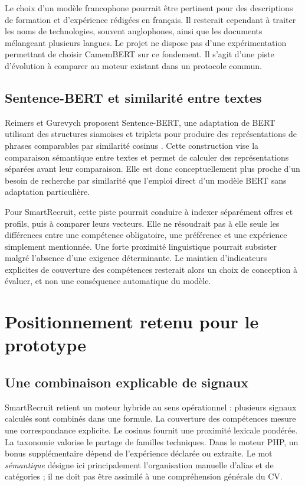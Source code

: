 Le choix d'un modèle francophone pourrait être pertinent pour des descriptions de formation et d'expérience rédigées en français. Il resterait cependant à traiter les noms de technologies, souvent anglophones, ainsi que les documents mélangeant plusieurs langues. Le projet ne dispose pas d'une expérimentation permettant de choisir CamemBERT sur ce fondement. Il s'agit d'une piste d'évolution à comparer au moteur existant dans un protocole commun.

\subsection{Sentence-BERT et similarité entre textes}

Reimers et Gurevych proposent Sentence-BERT, une adaptation de BERT utilisant des structures siamoises et triplets pour produire des représentations de phrases comparables par similarité cosinus \cite{reimers2019}. Cette construction vise la comparaison sémantique entre textes et permet de calculer des représentations séparées avant leur comparaison. Elle est donc conceptuellement plus proche d'un besoin de recherche par similarité que l'emploi direct d'un modèle BERT sans adaptation particulière.

Pour SmartRecruit, cette piste pourrait conduire à indexer séparément offres et profils, puis à comparer leurs vecteurs. Elle ne résoudrait pas à elle seule les différences entre une compétence obligatoire, une préférence et une expérience simplement mentionnée. Une forte proximité linguistique pourrait subsister malgré l'absence d'une exigence déterminante. Le maintien d'indicateurs explicites de couverture des compétences resterait alors un choix de conception à évaluer, et non une conséquence automatique du modèle.

\section{Positionnement retenu pour le prototype}

\subsection{Une combinaison explicable de signaux}

SmartRecruit retient un moteur hybride au sens opérationnel : plusieurs signaux calculés sont combinés dans une formule. La couverture des compétences mesure une correspondance explicite. Le cosinus fournit une proximité lexicale pondérée. La taxonomie valorise le partage de familles techniques. Dans le moteur PHP, un bonus supplémentaire dépend de l'expérience déclarée ou extraite. Le mot \emph{sémantique} désigne ici principalement l'organisation manuelle d'alias et de catégories ; il ne doit pas être assimilé à une compréhension générale du CV.

